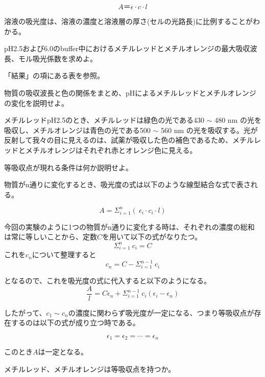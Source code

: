 \documentclass[a4paper,papersize,dvipdfmx]{jsarticle}
\begin{document}
\[A ＝\epsilon \cdot c \cdot l\]

溶液の吸光度は、溶液の濃度と溶液層の厚さ(セルの光路長)に比例することがわかる。

\begin{tcolorbox}[colback=white,colbacktitle=black!10!white,coltitle=black,title={2}]
pH2.5および6.0のbuffer中におけるメチルレッドとメチルオレンジの最大吸収波長、モル吸光係数を求めよ。
\end{tcolorbox}

「結果」の項にある表を参照。

\begin{tcolorbox}[colback=white,colbacktitle=black!10!white,coltitle=black,title={3}]
物質の吸収波長と色の関係をまとめ、pHによるメチルレッドとメチルオレンジの変化を説明せよ。
\end{tcolorbox}

メチルレッドpH2.5のとき、メチルレッドは緑色の光である430  $\sim$ 480 nm
の光を吸収し、メチルオレンジは青色の光である500 $\sim$ 560 nm の光を吸収する。光が反射して我々の目に見えるのは、試薬が吸収した色の補色であるため、メチルレッドとメチルオレンジはそれぞれ赤とオレンジ色に見える。

\begin{tcolorbox}[colback=white,colbacktitle=black!10!white,coltitle=black,title={4}]
等吸収点が現れる条件は何か説明せよ。
\end{tcolorbox}

物質がn通りに変化するとき、吸光度の式は以下のような線型結合な式で表される。

\[A = \Sigma_{i=1}^n \left( \ \epsilon _i \cdot c_i \cdot l \right)\]

今回の実験のように1つの物質がn通りに変化する時は、それぞれの濃度の総和は常に等しいことから、定数$C$を用いて以下の式がなりたつ。
\[\Sigma_{i=1}^n  \ c_i = C \]
これを$c_n$について整理すると
\[c_n = C - \Sigma_{i=1}^{n-1} \ c_i\]


となるので、これを吸光度の式に代入すると以下のようになる。
\[\frac{A}{l} = C \epsilon_n + \Sigma_{i=1}^{n-1}  \ c_i \left( \epsilon_i -\epsilon_n\right)\]

したがって、$c_1 \sim c_n$の濃度に関わらず吸光度が一定になる、つまり等吸収点が存在するのは以下の式が成り立つ時である。

\[\epsilon _1 = \epsilon _2 = \cdots = \epsilon _n\]

このとき$A$は一定となる。


\begin{tcolorbox}[colback=white,colbacktitle=black!10!white,coltitle=black,title={5}]
メチルレッド、メチルオレンジは等吸収点を持つか。
\end{tcolorbox}
\end{document}
